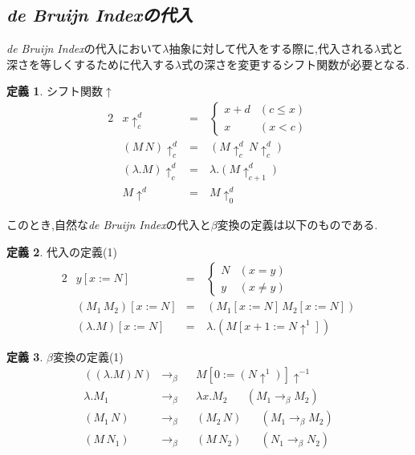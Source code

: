 \documentclass[a4j,10pt]{jsarticle}
\theoremstyle{definition}
\newtheorem{definition}{定義}
\newcommand{\betah}{\longrightarrow_\beta }
\begin{document}
\subsection*{\sl \textbf{de Bruijn Indexの代入}}
{\sl de Bruijn Index}の代入において\(\lambda\)抽象に対して代入をする際に,代入される\(\lambda\)式と深さを等しくするために代入する\(\lambda\)式の深さを変更するシフト関数が必要となる.
\begin{definition}
シフト関数\(\uparrow\)
\begin{alignat}{2}
    & x \uparrow_c^d & =\ & \left\{ 
    \begin{array}{ll}
         x + d & (c \leq x) \\
         x & (x < c)
    \end{array} \right. \\
    & (M\, N)\uparrow_c^d & =\ & (M \uparrow_c^d\, N \uparrow_c^d)\\
    & (\lambda . M)\uparrow_c^d & =\ &\lambda. (M \uparrow_{c+1}^d)\\
    & M \uparrow^d & =\ & M\uparrow_0^d
\end{alignat}
\end{definition}
このとき,自然な{\sl de Bruijn Index}の代入と\(\beta\)変換の定義は以下のものである.
\begin{definition}
代入の定義(1)
\begin{alignat}{2}
    & y[x:=N] &=\ & \left\{
    \begin{array}{ll}
        N &(x = y) \\
        y & (x \neq y) 
    \end{array} \right. \\
    & (M_1\, M_2)[x:=N] &=\ & (M_1[x:=N]\, M_2[x:=N]) \\
    & (\lambda. M)[x:= N] &=\ & \lambda. (M[x + 1 := N\uparrow^1])
\end{alignat}
\end{definition}
\begin{definition}
\(\beta\)変換の定義(1)
\begin{align}
    ((\lambda. M) N) &\betah& &M[0:= (N \uparrow^1) ]\uparrow^{-1} \\
    \lambda. M_1 &\betah& &\lambda x. M_2 \hspace{20pt} (M_1 \betah M_2)\\
    (M_1\, N) &\betah& &(M_2\, N) \hspace{20pt} (M_1 \betah M_2)\\
    (M\, N_1) &\betah& &(M\, N_2) \hspace{20pt} (N_1 \betah N_2)
\end{align}
\end{definition}
\end{document}
